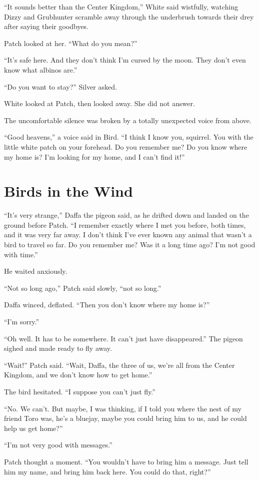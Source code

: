 \documentclass[ebook,oneside,openany,17pt]{memoir}
\renewcommand{\thechapter}{\Roman{chapter}}
\newcounter{sections}
\newcommand{\sections}[1]{%
  \section*{#1}
  \addtocounter{sections}{1}%
  \pdfbookmark[1]{#1}{section.\thechapter.\thesections}}
\begin{document}
“It sounds better than the Center Kingdom,” White said wistfully,
watching Dizzy and Grubhunter scramble away through the underbrush
towards their drey after saying their goodbyes.

Patch looked at her. “What do you mean?”

“It’s safe here. And they don’t think I’m cursed by the moon. They
don’t even know what albinos are.”

“Do you want to stay?” Silver asked.

White looked at Patch, then looked away. She did not answer.

The uncomfortable silence was broken by a totally unexpected voice
from above.

“Good heavens,” a voice said in Bird. “I think I know you,
squirrel. You with the little white patch on your forehead. Do you
remember me? Do you know where my home is? I’m looking for my home,
and I can’t find it!”


\sections{Birds in the Wind}

“It’s very strange,” Daffa the pigeon said, as he drifted down and
landed on the ground before Patch. “I remember exactly where I met you
before, both times, and it was very far away. I don’t think I’ve ever
known any animal that wasn’t a bird to travel so far. Do you remember
me? Was it a long time ago? I’m not good with time.”

He waited anxiously.

“Not so long ago,” Patch said slowly, “not so long.”

Daffa winced, deflated. “Then you don’t know where my home is?”

“I’m sorry.”

“Oh well. It has to be somewhere. It can’t just have disappeared.”
The pigeon sighed and made ready to fly away.

“Wait!” Patch said. “Wait, Daffa, the three of us, we’re all from the
Center Kingdom, and we don’t know how to get home.”

The bird hesitated. “I suppose you can’t just fly.”

“No. We can’t. But maybe, I was thinking, if I told you where the nest
of my friend Toro was, he’s a bluejay, maybe you could bring him to
us, and he could help us get home?”

“I’m not very good with messages.”

Patch thought a moment. “You wouldn’t have to bring him a
message. Just tell him my name, and bring him back here. You could do
that, right?”
\end{document}
